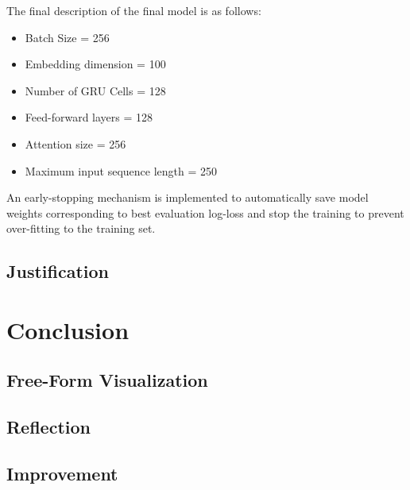 \documentclass{article}
\begin{document}
    The final description of the final model is as follows:


    \begin{itemize}
        \item Batch Size = 256
        \item Embedding dimension = 100
        \item Number of GRU Cells = 128
        \item Feed-forward layers = 128
        \item Attention size = 256
        \item Maximum input sequence length = 250
    \end{itemize}

    An early-stopping mechanism is implemented to automatically save model weights corresponding to best evaluation log-loss and stop the training to prevent over-fitting to the training set.


    \subsection{Justification}

\section{Conclusion}


    \subsection{Free-Form Visualization}


    \subsection{Reflection}

    \subsection{Improvement}






    
\end{document}
